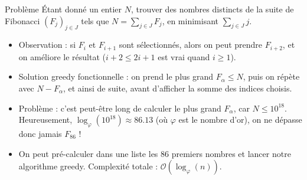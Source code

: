 \begin{frame}
    \frametitle{\problemtitle}
    \begin{block}{Problème}
        Étant donné un entier $N$, trouver des nombres distincts de la suite de Fibonacci $(F_{j})_{j \in J}$ tels que $N = \sum_{j \in J} F_{j}$, en minimisant $\sum_{j \in J} j$.
    \end{block}
    \pause
    \begin{itemize}[<+->]
        \item Observation : si $F_i$ et $F_{i+1}$ sont sélectionnés, alors on peut prendre $F_{i+2}$, et on améliore le résultat ($i+2 \leq 2i+1$ est vrai quand $i \geq 1$).
        \item Solution greedy fonctionnelle : on prend le plus grand $F_\alpha \leq N$, puis on répète avec $N - F_{\alpha}$, et ainsi de suite, avant d'afficher la somme des indices choisis.
        \item Problème : c'est peut-être long de calculer le plus grand $F_\alpha$, car $N \leq 10^{18}$. Heureusement, $\log_{\varphi}(10^{18}) \approx 86.13$ (où $\varphi$ est le nombre d'or), on ne dépasse donc jamais $F_{86}$ !
        \item On peut pré-calculer dans une liste les $86$ premiers nombres et lancer notre algorithme greedy. Complexité totale : $\mathcal{O}(\log_{\varphi}(n))$.
    \end{itemize}

\end{frame}